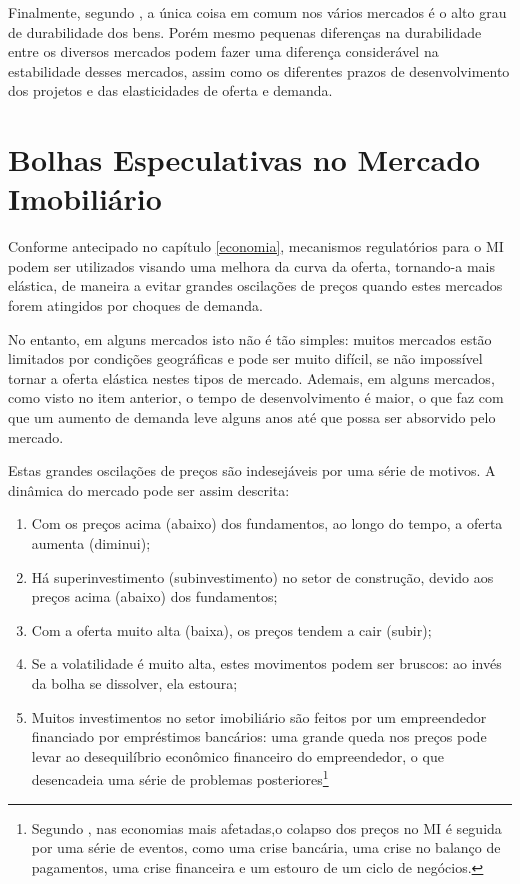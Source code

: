 \documentclass[
	12pt,				%
	oneside,			%
	a4paper,			%
	chapter=TITLE,		%
	section=TITLE,		%
	english,			%
	brazil				%
	]{abntex2}
\begin{document}
\begin{refsection}
Finalmente, segundo \textcite[p.~228]{wheaton1999}, a única coisa em comum nos vários
mercados é o alto grau de durabilidade dos bens. Porém mesmo pequenas diferenças
na durabilidade entre os diversos mercados podem fazer uma diferença
considerável na estabilidade desses mercados, assim como os diferentes prazos de
desenvolvimento dos projetos e das elasticidades de oferta e demanda.

\hypertarget{bolhas-especulativas-no-mercado-imobiliuxe1rio}{%
\section{Bolhas Especulativas no Mercado Imobiliário}\label{bolhas-especulativas-no-mercado-imobiliuxe1rio}}

Conforme antecipado no capítulo \ref{economia}, mecanismos regulatórios para o
\gls{MI} podem ser utilizados visando uma melhora da curva da oferta, tornando-a
mais elástica, de maneira a evitar grandes oscilações de preços quando estes
mercados forem atingidos por choques de demanda.

No entanto, em alguns mercados isto não é tão simples: muitos mercados estão
limitados por condições geográficas e pode ser muito difícil, se não impossível
tornar a oferta elástica nestes tipos de mercado. Ademais, em alguns mercados,
como visto no item anterior, o tempo de desenvolvimento é maior, o que faz com
que um aumento de demanda leve alguns anos até que possa ser absorvido pelo
mercado.

Estas grandes oscilações de preços são indesejáveis por uma série de motivos.
A dinâmica do mercado pode ser assim descrita:
\begin{enumerate}
\def\labelenumi{\arabic{enumi}.}
\tightlist
\item
  Com os preços acima (abaixo) dos fundamentos, ao longo do tempo, a oferta
  aumenta (diminui);
\item
  Há superinvestimento (subinvestimento) no setor de construção, devido aos
  preços acima (abaixo) dos fundamentos;
\item
  Com a oferta muito alta (baixa), os preços tendem a cair (subir);
\item
  Se a volatilidade é muito alta, estes movimentos podem ser bruscos: ao invés
  da bolha se dissolver, ela estoura;
\item
  Muitos investimentos no setor imobiliário são feitos por um empreendedor
  financiado por empréstimos bancários: uma grande queda nos preços pode levar
  ao desequilíbrio econômico financeiro do empreendedor, o que desencadeia uma
  série de problemas posteriores\footnote{Segundo \textcite[p.~2]{Malpezzi2002TheRO}, nas economias mais afetadas,o colapso
    dos preços no \gls{MI} é seguida por uma série de eventos, como uma crise
    bancária, uma crise no balanço de pagamentos, uma crise financeira e um estouro
    de um ciclo de negócios.}
\end{enumerate}
\hypertarget{o-papel-da-oferta-na-prevenuxe7uxe3o-de-bolhas}{%
}
\end{refsection}
\end{document}
